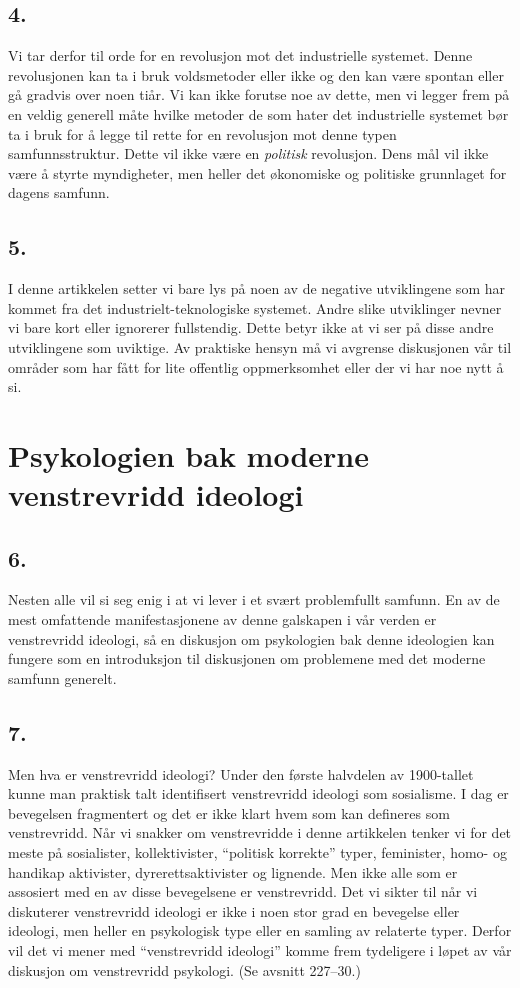 \documentclass[oneside]{book}
\begin{document}
\section*{4.}
Vi tar derfor til orde for en revolusjon mot det industrielle systemet. Denne
revolusjonen kan ta i bruk voldsmetoder eller ikke og den kan være spontan
eller gå gradvis over noen tiår. Vi kan ikke forutse noe av dette, men vi
legger frem på en veldig generell måte hvilke metoder de som hater det
industrielle systemet bør ta i bruk for å legge til rette for en revolusjon mot
denne typen samfunnsstruktur. Dette vil ikke være en \emph{politisk} revolusjon.
Dens mål vil ikke være å styrte myndigheter, men heller det økonomiske og
politiske grunnlaget for dagens samfunn.

\section*{5.}
I denne artikkelen setter vi bare lys på noen av de negative utviklingene som
har kommet fra det industrielt-teknologiske systemet. Andre slike utviklinger
nevner vi bare kort eller ignorerer fullstendig. Dette betyr ikke at vi ser på
disse andre utviklingene som uviktige. Av praktiske hensyn må vi avgrense
diskusjonen vår til områder som har fått for lite offentlig oppmerksomhet eller
der vi har noe nytt å si.

\chapter{Psykologien bak moderne venstrevridd ideologi}
\section*{6.}
Nesten alle vil si seg enig i at vi lever i et svært problemfullt samfunn. En
av de mest omfattende manifestasjonene av denne galskapen i vår verden er
venstrevridd ideologi, så en diskusjon om psykologien bak denne ideologien kan
fungere som en introduksjon til diskusjonen om problemene med det moderne
samfunn generelt.

\section*{7.}
Men hva er venstrevridd ideologi? Under den første halvdelen av 1900-tallet
kunne man praktisk talt identifisert venstrevridd ideologi som sosialisme. I
dag er bevegelsen fragmentert og det er ikke klart hvem som kan defineres som
venstrevridd. Når vi snakker om venstrevridde i denne artikkelen tenker vi for
det meste på sosialister, kollektivister, ``politisk korrekte'' typer,
feminister, homo- og handikap aktivister, dyrerettsaktivister og lignende. Men
ikke alle som er assosiert med en av disse bevegelsene er venstrevridd. Det vi
sikter til når vi diskuterer venstrevridd ideologi er ikke i noen stor grad en
bevegelse eller ideologi, men heller en psykologisk type eller en samling av
relaterte typer. Derfor vil det vi mener med ``venstrevridd ideologi'' komme
frem tydeligere i løpet av vår diskusjon om venstrevridd psykologi. (Se avsnitt
227--30.)
\end{document}
